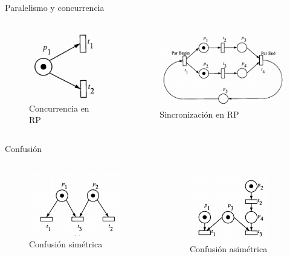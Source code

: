\documentclass[
compress,
xcolor=table,
dvipsnames,
]{beamer}
\begin{document}

\begin{frame}{Paralelismo y concurrencia}
  \begin{columns}
    \begin{figure}[h]
        \includegraphics[scale=0.7]{graphics/concurrency_rp.png}
        \caption{Concurrencia en RP \citep{Murata:89}}
    \end{figure}
        \begin{figure}[h]
            \includegraphics[scale=0.7]{graphics/parallel_activities.png}
            \caption{Sincronización en RP \citep{Murata:89}}
        \end{figure}
  \end{columns}
\end{frame}


\begin{frame}{Confusión}
  \begin{columns}
    \begin{figure}[h]
        \includegraphics[scale=1]{graphics/symmetric_confusion.png}
        \caption{Confusión simétrica \citep{Murata:89}}
    \end{figure}
        \begin{figure}[h]
            \includegraphics[scale=1]{graphics/asymmetric_confusion.png}
            \caption{Confusión asimétrica \citep{Murata:89}}
        \end{figure}
  \end{columns}
\end{frame}
\end{document}
